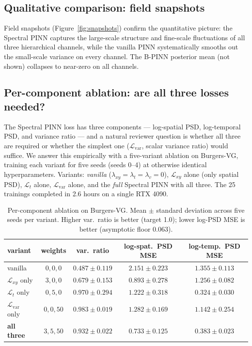 \documentclass[review,12pt]{elsarticle}
\begin{document}
\subsection{Qualitative comparison: field snapshots}
\label{subsec:qualitative}

Field snapshots (Figure~\ref{fig:snapshots}) confirm the quantitative picture: the Spectral PINN captures the large-scale structure and fine-scale fluctuations of all three hierarchical channels, while the vanilla PINN systematically smooths out the small-scale variance on every channel. The B-PINN posterior mean (not shown) collapses to near-zero on all channels.
\subsection{Per-component ablation: are all three losses needed?}
\label{subsec:ablation}

The Spectral PINN loss has three components --- log-spatial PSD,
log-temporal PSD, and variance ratio --- and a natural reviewer
question is whether all three are required or whether the simplest
one ($\mathcal{L}_{\mathrm{var}}$, scalar variance ratio) would
suffice. We answer this empirically with a five-variant ablation on
Burgers-VG, training each variant for five seeds (seeds 0--4) at
otherwise identical hyperparameters. Variants:
\emph{vanilla} ($\lambda_{xy} = \lambda_{t} = \lambda_{v} = 0$),
$\mathcal{L}_{xy}$ alone (only spatial PSD),
$\mathcal{L}_{t}$ alone, $\mathcal{L}_{\mathrm{var}}$ alone, and the
\emph{full} Spectral PINN with all three. The 25 trainings
completed in 2.6 hours on a single RTX 4090.

\begin{table}[h]
\centering
\caption{Per-component ablation on Burgers-VG. Mean $\pm$ standard
deviation across five seeds per variant. Higher var.\ ratio is better
(target 1.0); lower log-PSD MSE is better (asymptotic floor 0.063).}
\label{tab:ablation}
\begin{tabular}{l c c c c}
\toprule
variant & weights & var.\ ratio & log-spat.\ PSD MSE & log-temp.\ PSD MSE \\
\midrule
vanilla                          & $0,0,0$    & $0.487 \pm 0.119$ & $2.151 \pm 0.223$ & $1.355 \pm 0.113$ \\
$\mathcal{L}_{xy}$ only          & $3,0,0$    & $0.679 \pm 0.153$ & $0.893 \pm 0.278$ & $1.256 \pm 0.082$ \\
$\mathcal{L}_{t}$  only          & $0,5,0$    & $0.970 \pm 0.294$ & $1.222 \pm 0.318$ & $0.324 \pm 0.030$ \\
$\mathcal{L}_{\mathrm{var}}$ only & $0,0,50$  & $0.983 \pm 0.019$ & $1.282 \pm 0.169$ & $1.142 \pm 0.254$ \\
\textbf{all three}               & $3,5,50$   & $0.932 \pm 0.022$ & $0.733 \pm 0.125$ & $0.383 \pm 0.023$ \\
\bottomrule
\end{tabular}
\end{table}
\end{document}
